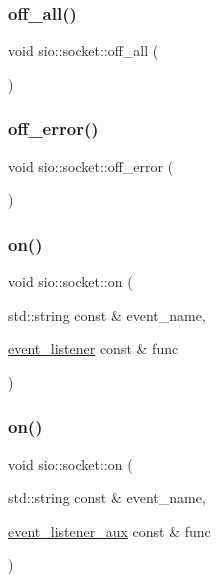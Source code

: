 \subsubsection{\texorpdfstring{off\+\_\+all()}{off\_all()}}
{\footnotesize\ttfamily void sio\+::socket\+::off\+\_\+all (\begin{DoxyParamCaption}{ }\end{DoxyParamCaption})}

\mbox{\label{classsio_1_1socket_a5528f1721aafc0cdd20effb9a80db087}} 
\subsubsection{\texorpdfstring{off\+\_\+error()}{off\_error()}}
{\footnotesize\ttfamily void sio\+::socket\+::off\+\_\+error (\begin{DoxyParamCaption}{ }\end{DoxyParamCaption})}

\mbox{\label{classsio_1_1socket_ab7b366ed08cef9820db1bd019a8c06ec}} 
\subsubsection{\texorpdfstring{on()}{on()}\hspace{0.1cm}{\footnotesize\ttfamily [1/2]}}
{\footnotesize\ttfamily void sio\+::socket\+::on (\begin{DoxyParamCaption}\item[{std\+::string const \&}]{event\+\_\+name,  }\item[{\hyperlink{classsio_1_1socket_ae0b1d93ef97af0d6d4f588e1e2a103b5}{event\+\_\+listener} const \&}]{func }\end{DoxyParamCaption})}

\mbox{\label{classsio_1_1socket_a6d3adaddc50f1a407e58d74b6d3d1367}} 
\subsubsection{\texorpdfstring{on()}{on()}\hspace{0.1cm}{\footnotesize\ttfamily [2/2]}}
{\footnotesize\ttfamily void sio\+::socket\+::on (\begin{DoxyParamCaption}\item[{std\+::string const \&}]{event\+\_\+name,  }\item[{\hyperlink{classsio_1_1socket_a426d9236f95762375d3b86caa2b4faaf}{event\+\_\+listener\+\_\+aux} const \&}]{func }\end{DoxyParamCaption})}


